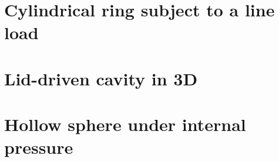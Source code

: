 \section{Cylindrical ring subject to a line load} \label{ss:ringlineload}


\section{Lid-driven cavity in 3D} \label{ss:liddriven3D}


\section{Hollow sphere under internal pressure} \label{ss:hollowsphereintpress}



